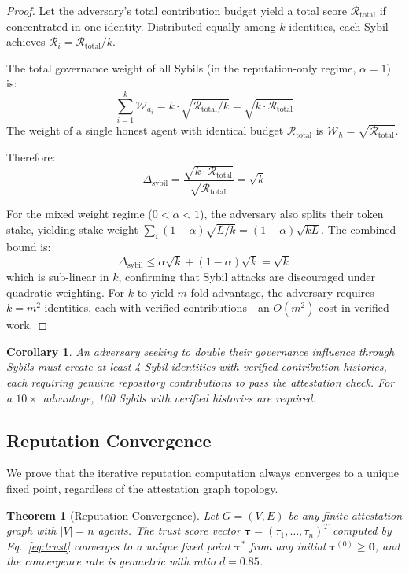 \documentclass[conference]{IEEEtran}
\newtheorem{theorem}{Theorem}
\newtheorem{corollary}{Corollary}
\begin{document}
\begin{proof}
Let the adversary's total contribution budget yield a total score $\mathcal{R}_{\text{total}}$ if concentrated in one identity. Distributed equally among $k$ identities, each Sybil achieves $\mathcal{R}_i = \mathcal{R}_{\text{total}} / k$.

The total governance weight of all Sybils (in the reputation-only regime, $\alpha = 1$) is:
\[
\sum_{i=1}^k \mathcal{W}_{a_i} = k \cdot \sqrt{\mathcal{R}_{\text{total}} / k} = \sqrt{k \cdot \mathcal{R}_{\text{total}}}
\]
The weight of a single honest agent with identical budget $\mathcal{R}_{\text{total}}$ is $\mathcal{W}_h = \sqrt{\mathcal{R}_{\text{total}}}$.

Therefore:
\[
\Delta_{\text{sybil}} = \frac{\sqrt{k \cdot \mathcal{R}_{\text{total}}}}{\sqrt{\mathcal{R}_{\text{total}}}} = \sqrt{k}
\]

For the mixed weight regime ($0 < \alpha < 1$), the adversary also splits their token stake, yielding stake weight $\sum_i (1-\alpha)\sqrt{L/k} = (1-\alpha)\sqrt{kL}$. The combined bound is:
\[
\Delta_{\text{sybil}} \leq \alpha\sqrt{k} + (1-\alpha)\sqrt{k} = \sqrt{k}
\]
which is sub-linear in $k$, confirming that Sybil attacks are discouraged under quadratic weighting. For $k$ to yield $m$-fold advantage, the adversary requires $k = m^2$ identities, each with verified contributions---an $O(m^2)$ cost in verified work.
\end{proof}

\begin{corollary}
An adversary seeking to double their governance influence through Sybils must create at least 4 Sybil identities with verified contribution histories, each requiring genuine repository contributions to pass the attestation check. For a $10\times$ advantage, 100 Sybils with verified histories are required.
\end{corollary}

\subsection{Reputation Convergence}

We prove that the iterative reputation computation always converges to a unique fixed point, regardless of the attestation graph topology.

\begin{theorem}[Reputation Convergence]\label{thm:rep_convergence}
Let $G = (V, E)$ be any finite attestation graph with $|V| = n$ agents. The trust score vector $\boldsymbol{\tau} = (\tau_1, \ldots, \tau_n)^T$ computed by Eq.~\eqref{eq:trust} converges to a unique fixed point $\boldsymbol{\tau}^*$ from any initial $\boldsymbol{\tau}^{(0)} \geq \mathbf{0}$, and the convergence rate is geometric with ratio $d = 0.85$.
\end{theorem}
\end{document}
